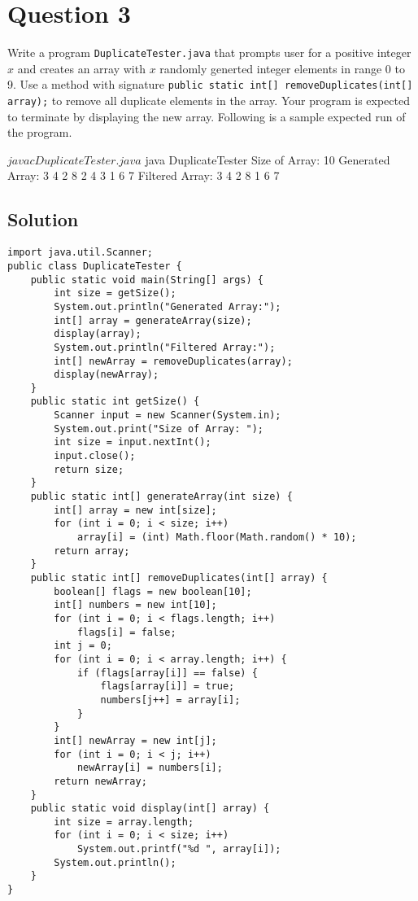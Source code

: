 \documentclass[12pt,letterpaper,twoside]{article}
\begin{document}
\newpage

\section*{Question 3}

Write a program \texttt{DuplicateTester.java} that prompts user for a positive integer $x$ and creates an array with $x$ randomly generted integer elements in range 0 to 9.
Use a method with signature \texttt{public static int[] removeDuplicates(int[] array);} to remove all duplicate elements in the array.
Your program is expected to terminate by displaying the new array.
Following is a sample expected run of the program.

\begin{terminal}
$ javac DuplicateTester.java
$ java DuplicateTester
Size of Array: 10
Generated Array:
3 4 2 8 2 4 3 1 6 7
Filtered Array:
3 4 2 8 1 6 7
\end{terminal}

\subsection*{Solution}

\lstset{language=Java,tabsize=4}
\begin{lstlisting}
import java.util.Scanner;
public class DuplicateTester {
	public static void main(String[] args) {
		int size = getSize();
		System.out.println("Generated Array:");
		int[] array = generateArray(size);
		display(array);
		System.out.println("Filtered Array:");
		int[] newArray = removeDuplicates(array);
		display(newArray);
	}
	public static int getSize() {
		Scanner input = new Scanner(System.in);
		System.out.print("Size of Array: ");
		int size = input.nextInt();
		input.close();
		return size;
	}
	public static int[] generateArray(int size) {
		int[] array = new int[size];
		for (int i = 0; i < size; i++)
			array[i] = (int) Math.floor(Math.random() * 10);
		return array;
	}
	public static int[] removeDuplicates(int[] array) {
		boolean[] flags = new boolean[10];
		int[] numbers = new int[10];
		for (int i = 0; i < flags.length; i++)
			flags[i] = false;
		int j = 0;
		for (int i = 0; i < array.length; i++) {
			if (flags[array[i]] == false) {
				flags[array[i]] = true;
				numbers[j++] = array[i];
			}
		}
		int[] newArray = new int[j];
		for (int i = 0; i < j; i++)
			newArray[i] = numbers[i];
		return newArray;
	}
	public static void display(int[] array) {
		int size = array.length;
		for (int i = 0; i < size; i++)
			System.out.printf("%d ", array[i]);
		System.out.println();
	}
}
\end{lstlisting}
\end{document}
